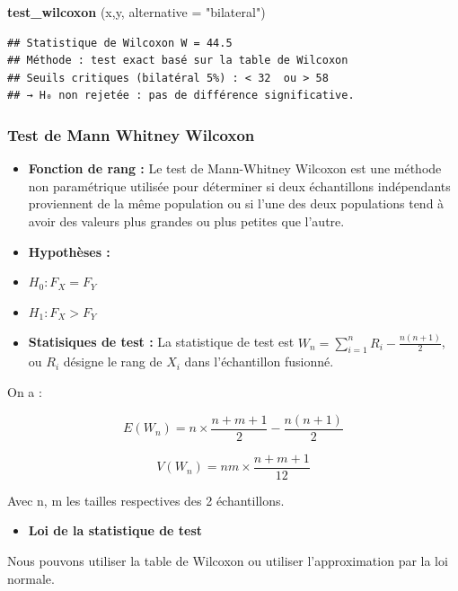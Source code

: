 \documentclass[
  12pt,
]{article}
\newenvironment{Shaded}{\begin{snugshade}}{\end{snugshade}}
\newcommand{\AttributeTok}[1]{\textcolor[rgb]{0.13,0.29,0.53}{#1}}
\newcommand{\FunctionTok}[1]{\textcolor[rgb]{0.13,0.29,0.53}{\textbf{#1}}}
\newcommand{\NormalTok}[1]{#1}
\newcommand{\StringTok}[1]{\textcolor[rgb]{0.31,0.60,0.02}{#1}}
\providecommand{\tightlist}{%
  \setlength{\itemsep}{0pt}\setlength{\parskip}{0pt}}
\begin{document}
\begin{Shaded}
\begin{Highlighting}[]
\FunctionTok{test\_wilcoxon}\NormalTok{ (x,y, }\AttributeTok{alternative =} \StringTok{"bilateral"}\NormalTok{)}
\end{Highlighting}
\end{Shaded}

\begin{verbatim}
## Statistique de Wilcoxon W = 44.5 
## Méthode : test exact basé sur la table de Wilcoxon
## Seuils critiques (bilatéral 5%) : < 32  ou > 58 
## → H₀ non rejetée : pas de différence significative.
\end{verbatim}

\subsubsection{Test de Mann Whitney
Wilcoxon}\label{test-de-mann-whitney-wilcoxon}

\begin{itemize}
\item
  \textbf{Fonction de rang : } Le test de Mann-Whitney Wilcoxon est une
  méthode non paramétrique utilisée pour déterminer si deux échantillons
  indépendants proviennent de la même population ou si l'une des deux
  populations tend à avoir des valeurs plus grandes ou plus petites que
  l'autre.
\item
  \textbf{Hypothèses :}
\item
  \(H_0 : F_X = F_Y\)
\item
  \(H_1 : F_X > F_Y\)
\item
  \textbf{Statisiques de test : } La statistique de test est
  \(W_n = \sum_{i=1}^{n} R_i -\frac{n(n+1)}{2}\), ou \(R_i\) désigne le
  rang de \(X_i\) dans l'échantillon fusionné.
\end{itemize}

On a :

\[E(W_n) = n \times \frac{n+m+1}{2}-\frac{n(n+1)}{2}\]

\[V(W_n) = n m \times \frac{n+m+1}{12}\]

Avec n, m les tailles respectives des 2 échantillons.

\begin{itemize}
\tightlist
\item
  \textbf{Loi de la statistique de test}
\end{itemize}

Nous pouvons utiliser la table de Wilcoxon ou utiliser l'approximation
par la loi normale.
\end{document}
